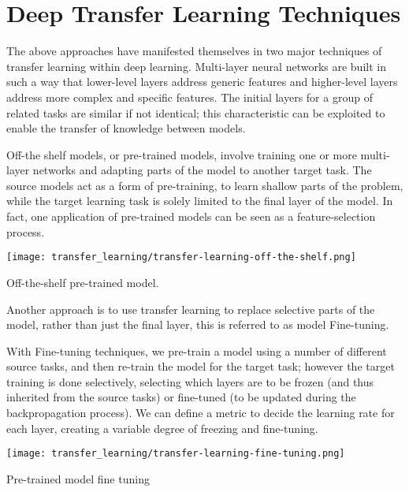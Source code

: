\section{Deep Transfer Learning Techniques}\label{sec:transfer-learning-deep-techniques}

The above approaches have manifested themselves in two major techniques of transfer learning within deep learning. Multi-layer neural networks are built in such a way that lower-level layers address generic features and higher-level layers address more complex and specific features. The initial layers for a group of related tasks are similar if not identical; this characteristic can be exploited to enable the transfer of knowledge between models. \citep{yosinski2014}
\newpage


Off-the shelf models, or pre-trained models, involve training one or more multi-layer networks and adapting parts of the model to another target task. The source models act as a form of pre-training, to learn shallow parts of the problem, while the target learning task is solely limited to the final layer of the model. In fact, one application of pre-trained models can be seen as a feature-selection process. \citep{zhu2018}

\begin{marginfigure}
  \texttt{[image: transfer\_learning/transfer-learning-off-the-shelf.png]}
  \caption{Off-the-shelf pre-trained model.}
  \label{fig:transferlearning_pretrained_ots}
\end{marginfigure}

Another approach is to use transfer learning to replace selective parts of the model, rather than just the final layer, this is referred to as model Fine-tuning. 

With Fine-tuning techniques, we pre-train a model using a number of different source tasks, and then re-train the model for the target task; however the target training is done selectively, selecting which layers are to be frozen (and thus inherited from the source tasks) or fine-tuned (to be updated during the backpropagation process). We can define a metric to decide the learning rate for each layer, creating a variable degree of freezing and fine-tuning. \citep{madhavan2016}

\begin{marginfigure}
  \texttt{[image: transfer\_learning/transfer-learning-fine-tuning.png]}
  \caption{Pre-trained model fine tuning}
  \label{fig:transferlearning_pretrained_finetuning}
 
\end{marginfigure}


